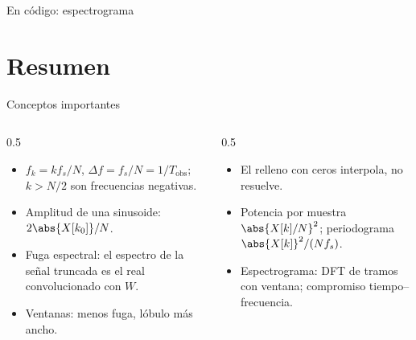 \documentclass[aspectratio=169,11pt]{beamer}
\begin{document}
\begin{frame}{En código: espectrograma}
\end{frame}

\section*{Resumen}
\begin{frame}{Conceptos importantes}
  \begin{columns}[T]
    \begin{column}{0.5\textwidth}
      \begin{itemize}
        \item $f_k=kf_s/N$, $\Delta f=f_s/N=1/T_{\text{obs}}$; $k>N/2$ son frecuencias negativas.
        \item Amplitud de una sinusoide: $2\abs{X[k_0]}/N$.
        \item Fuga espectral: el espectro de la señal truncada es el real convolucionado con $W$.
        \item Ventanas: menos fuga, lóbulo más ancho.
      \end{itemize}
    \end{column}
    \begin{column}{0.5\textwidth}
      \begin{itemize}
        \item El relleno con ceros interpola, no resuelve.
        \item Potencia por muestra $\abs{X[k]/N}^2$; periodograma $\abs{X[k]}^2/(Nf_s)$.
        \item Espectrograma: DFT de tramos con ventana; compromiso tiempo–frecuencia.
      \end{itemize}
    \end{column}
  \end{columns}
  \bigskip
\end{frame}
\end{document}
